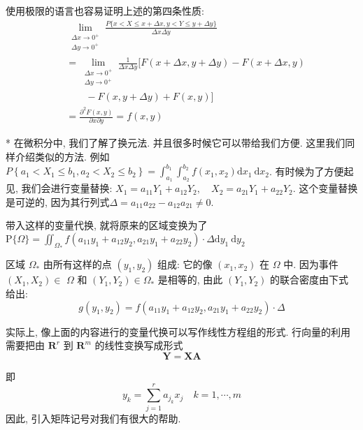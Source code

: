     使用极限的语言也容易证明上述的第四条性质: 
    $$
            \begin{aligned}
                 & \lim _{\substack{\Delta x \rightarrow 0^{+}                                                                 \\
                \Delta y \rightarrow 0^{+}}} \frac{P\{x<X \leqslant x+\Delta x, y<Y \leqslant y+\Delta y\}}{\Delta x \Delta y} \\
                 & = \lim _{\substack{\Delta x \rightarrow 0^{+}                                                               \\
                \Delta y \rightarrow 0^{+}}} \frac{1}{\Delta x \Delta y}[ F(x+\Delta x, y+\Delta y)-F(x+\Delta x, y)           \\
                 & \quad \quad  -F(x, y+\Delta y)+F(x, y)]                                                                     \\
                 & =\frac{\partial^2 F(x, y)}{\partial x \partial y}=f(x, y)
            \end{aligned}
        $$
  \begin{remark}
    * 在微积分中, 我们了解了换元法. 并且很多时候它可以带给我们方便. 这里我们同样介绍类似的方法. 例如${P}\left\{a_1<X_1 \leqslant b_1, a_2<X_2 \leqslant b_2\right\}=\int_{a_1}^{b_1} \int_{a_2}^{b_2} f\left(x_1, x_2\right) \mathrm{d} x_1 \mathrm{~d} x_2$. 有时候为了方便起见, 我们会进行变量替换: $X_1=a_{11} Y_1+a_{12} Y_2, \quad X_2=a_{21} Y_1+a_{22} Y_2$. 这个变量替换是可逆的, 因为其行列式$\Delta=a_{11} a_{22}-a_{12} a_{21}\neq 0$. 

    带入这样的变量代换, 就将原来的区域变换为了$\mathrm{P}\{\Omega\}=\iint_{\Omega_*} f\left(a_{11} y_1+a_{12} y_2, a_{21} y_1+a_{22} y_2\right) \cdot \Delta \mathrm{d} y_1 \mathrm{~d} y_2$

    区域 $\Omega_*$ 由所有这样的点 $\left(y_1, y_2\right)$ 组成: 它的像 $\left(x_1, x_2\right)$ 在 $\Omega$ 中. 因为事件 $\left(X_1, X_2\right) \in$ $\Omega$ 和 $\left(Y_1, Y_2\right) \in \Omega_*$ 是相等的, 由此 $\left(Y_1, Y_2\right)$ 的联合密度由下式给出:
$$
g\left(y_1, y_2\right)=f\left(a_{11} y_1+a_{12} y_2, a_{21} y_1+a_{22} y_2\right) \cdot \Delta
$$

实际上, 像上面的内容进行的变量代换可以写作线性方程组的形式. 
行向量的利用需要把由 $\mathbf{R}^r$ 到 $\mathbf{R}^m$ 的线性变换写成形式
$$
\boldsymbol{Y}=\boldsymbol{X} \boldsymbol{A}
$$

即
$$
y_k=\sum_{j=1}^r a_{j_k} x_j \quad k=1, \cdots, m
$$
因此, 引入矩阵记号对我们有很大的帮助. 
  \end{remark}


